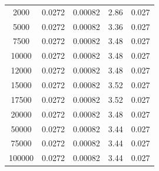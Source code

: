 \documentclass[10pt,a4paper]{article}
\begin{document}
\begin{table}[htp!]
\begin{center}
\begin{tabular}{|c|c|c|c|c|}
2000                               & 0.0272                                & 0.00082                                     & 2.86                                        & 0.027                                       \\
5000                               & 0.0272                                & 0.00082                                     & 3.36                                        & 0.027                                       \\
7500                               & 0.0272                                & 0.00082                                     & 3.48                                        & 0.027                                       \\
10000                              & 0.0272                                & 0.00082                                     & 3.48                                        & 0.027                                       \\
12000                              & 0.0272                                & 0.00082                                     & 3.48                                        & 0.027                                       \\
15000                              & 0.0272                                & 0.00082                                     & 3.52                                        & 0.027                                       \\
17500                              & 0.0272                                & 0.00082                                     & 3.52                                        & 0.027                                       \\
20000                              & 0.0272                                & 0.00082                                     & 3.48                                        & 0.027                                       \\
50000                              & 0.0272                                & 0.00082                                     & 3.44                                        & 0.027                                       \\
75000                              & 0.0272                                & 0.00082                                     & 3.44                                        & 0.027                                       \\
100000                             & 0.0272                                & 0.00082                                     & 3.44                                        & 0.027                                       \\

\end{tabular}
\end{center}
\end{table}
\end{document}
